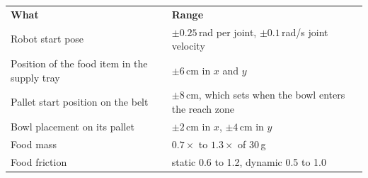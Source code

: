 \documentclass[border=12pt]{standalone}
\newcommand{\headrule}{\noalign{\global\arrayrulewidth=1.2pt}\hline\noalign{\global\arrayrulewidth=0.4pt}}
\begin{document}
\begin{tabular}{|L{7.0cm}|L{8.4cm}|}
\hline
\textbf{What} & \textbf{Range} \\
\headrule
Robot start pose & $\pm0.25$\,rad per joint, $\pm0.1$\,rad/s joint velocity \\ \hline
Position of the food item in the supply tray & $\pm6$\,cm in $x$ and $y$ \\ \hline
Pallet start position on the belt & $\pm8$\,cm, which sets when the bowl enters the reach zone \\ \hline
Bowl placement on its pallet & $\pm2$\,cm in $x$, $\pm4$\,cm in $y$ \\ \hline
Food mass & $0.7\times$ to $1.3\times$ of 30\,g \\ \hline
Food friction & static 0.6 to 1.2, dynamic 0.5 to 1.0 \\
\hline
\end{tabular}
\end{document}

